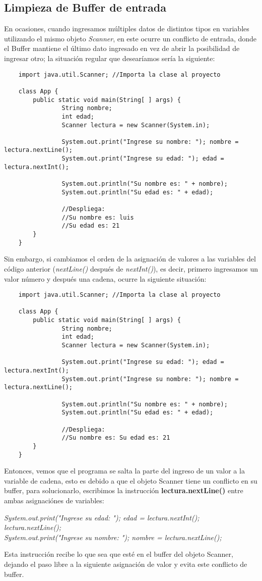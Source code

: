 \subsection{Limpieza de Buffer de entrada}
En ocasiones, cuando ingresamos múltiples datos de distintos tipos en variables utilizando el mismo objeto \textit{Scanner}, en este ocurre un conflicto de entrada, donde el Buffer mantiene el último dato ingresado en vez de abrir la posibilidad de ingresar otro; la situación regular que desearíamos sería la siguiente:
\begin{lstlisting}
    import java.util.Scanner; //Importa la clase al proyecto

    class App {
        public static void main(String[ ] args) {
        		String nombre;
        		int edad;
        		Scanner lectura = new Scanner(System.in);
        		
        		System.out.print("Ingrese su nombre: "); nombre = lectura.nextLine();
        		System.out.print("Ingrese su edad: "); edad = lectura.nextInt();
        		
        		System.out.println("Su nombre es: " + nombre);
        		System.out.println("Su edad es: " + edad);
        		
        		//Despliega:
        		//Su nombre es: luis
        		//Su edad es: 21
        }
    }
\end{lstlisting}
Sin embargo, si cambiamos el orden de la asignación de valores a las variables del código anterior (\textit{nextLine()} después de \textit{nextInt()}), es decir, primero ingresamos un valor número y después una cadena, ocurre la siguiente situación:
\begin{lstlisting}
    import java.util.Scanner; //Importa la clase al proyecto

    class App {
        public static void main(String[ ] args) {
        		String nombre;
        		int edad;
        		Scanner lectura = new Scanner(System.in);
        		
        		System.out.print("Ingrese su edad: "); edad = lectura.nextInt();
        		System.out.print("Ingrese su nombre: "); nombre = lectura.nextLine();
        		
        		System.out.println("Su nombre es: " + nombre);
        		System.out.println("Su edad es: " + edad);
        		
        		//Despliega:
        		//Su nombre es: Su edad es: 21
        }
    }
\end{lstlisting}
Entonces, vemos que el programa se salta la parte del ingreso de un valor a la variable de cadena, esto es debido a que el objeto Scanner tiene un conflicto en su buffer, para solucionarlo, escribimos la instrucción \textbf{lectura.nextLine()} entre ambas asignaciónes de variables:\begin{center}\textit{System.out.print("Ingrese su edad: "); edad = lectura.nextInt();\\lectura.nextLine();\\System.out.print("Ingrese su nombre: "); nombre = lectura.nextLine();}\end{center}
Esta instrucción recibe lo que sea que esté en el buffer del objeto Scanner, dejando el paso libre a la siguiente asignación de valor y evita este conflicto de buffer.

